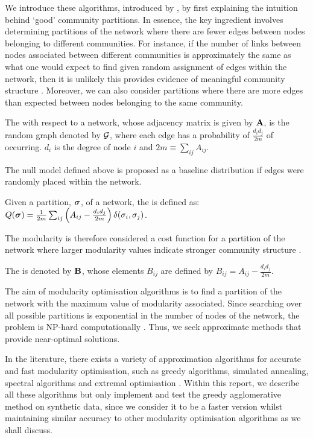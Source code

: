 We introduce these algorithms, introduced by \cite{New06a,New06b}, by first explaining the intuition behind `good' community partitions.
In essence, the key ingredient involves determining partitions of the network where there are fewer edges  between nodes belonging to different communities.
For instance, if the number of links between nodes associated between different communities is approximately the same as what one would expect to find given random assignment of edges within the network, then it is unlikely this provides evidence of meaningful community structure \cite{New06b}.
Moreover, we can also consider partitions where there are more edges than expected between nodes belonging to the same community.
\begin{definition}
	\label{def:nullModel}
	The  with respect to a network, whose adjacency matrix is given by  $\mathbf A$, is the random graph denoted by $\mathcal G$, where each edge has a probability of $\frac{d_{i}d_{j}}{2m}$ of occurring. $d_{i}$ is the degree of node $i$ and $2m \equiv \sum_{ij} A_{ij}$.
\end{definition}
The null model defined above is proposed as a baseline distribution if edges were randomly placed within the network.
\begin{definition}
	\label{def:modularity}
	Given a partition, $\vecvar{\sigma}$, of a network, the  is defined as: $Q(\vecvar{\sigma}) = \frac{1}{2m} \sum_{ij} \left(A_{ij} - \frac{d_{i}d_{j}}{2m} \right) \delta(\sigma_{i},\sigma_{j})$.
\end{definition}
The modularity is therefore considered a cost function for a partition of the network where larger modularity values indicate stronger community structure \cite{New06a}.
\begin{definition}
	\label{def:modularityMatrix}
	The  is denoted by $\mathbf B$, whose elements $B_{ij}$ are defined by $B_{ij} = A_{ij} - \frac{d_{i}d_{j}}{2m}$.
\end{definition}
The aim of modularity optimisation algorithms is to find a partition of the network with the maximum value of modularity associated.
Since searching over all possible partitions is exponential in the number of nodes of the network, the problem is NP-hard computationally \cite{New06b}.
Thus, we seek approximate methods that provide near-optimal solutions.

In the literature, there exists a variety of approximation algorithms for accurate and fast modularity optimisation, such as greedy algorithms, simulated annealing, spectral algorithms and extremal optimisation \cite{For10}.
Within this report, we describe all these algorithms but only implement and test the greedy agglomerative method on synthetic data, since we consider it to be a faster version whilst maintaining similar accuracy to other modularity optimisation algorithms as we shall discuss.


